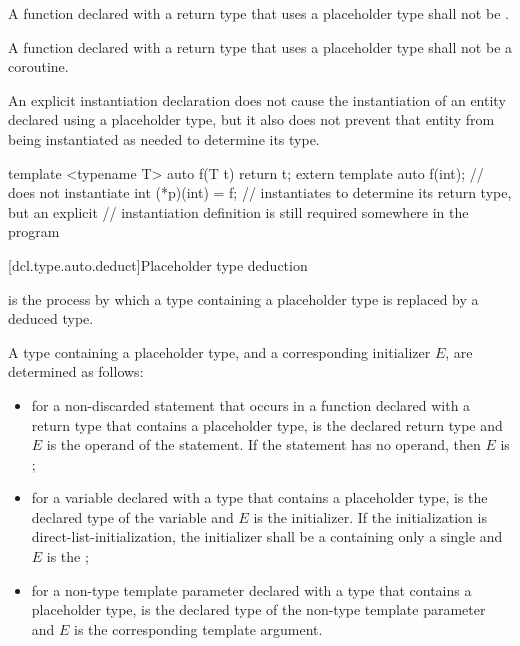 \pnum
A function declared with a return type that uses a placeholder type shall not
be .

\pnum
A function declared with a return type that uses a placeholder type shall not
be a coroutine.

\pnum
An explicit instantiation declaration does not cause the
instantiation of an entity declared using a placeholder type, but it also does
not prevent that entity from being instantiated as needed to determine its
type.
\begin{example}
\begin{codeblock}
template <typename T> auto f(T t) { return t; }
extern template auto f(int);    // does not instantiate 
int (*p)(int) = f;              // instantiates  to determine its return type, but an explicit
                                // instantiation definition is still required somewhere in the program
\end{codeblock}
\end{example}

[dcl.type.auto.deduct]{Placeholder type deduction}
%

\pnum
{}
is the process by which
a type containing a placeholder type
is replaced by a deduced type.

\pnum
A type  containing a placeholder type,
and a corresponding initializer $E$,
are determined as follows:
\begin{itemize}
\item
for a non-discarded  statement that occurs
in a function declared with a return type
that contains a placeholder type,
 is the declared return type
and $E$ is the operand of the  statement.
If the  statement
has no operand,
then $E$ is ;
\item
for a variable declared with a type
that contains a placeholder type,
 is the declared type of the variable
and $E$ is the initializer.
If the initialization is direct-list-initialization,
the initializer shall be a 
containing only a single 
and $E$ is the ;
\item
for a non-type template parameter declared with a type
that contains a placeholder type,
 is the declared type of the non-type template parameter
and $E$ is the corresponding template argument.
\end{itemize}

